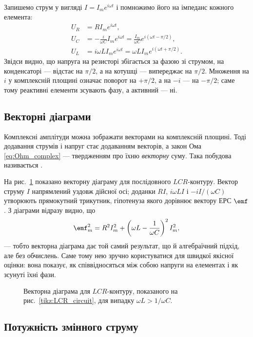 Запишемо струм у вигляді $I = I_m e^{i\omega t}$ і помножимо його на імпеданс кожного елемента:
\begin{align}
	U_R &= R I_m e^{i\omega t}, \label{eq:UR_phase} \\[4pt]
	U_C &= -\frac{i}{\omega C} I_m e^{i\omega t}
	      = \frac{I_m}{\omega C} e^{i(\omega t - \pi/2)}, \label{eq:UC_phase} \\[4pt]
	U_L &= i\omega L I_m e^{i\omega t}
	      = \omega L I_m e^{i(\omega t + \pi/2)}. \label{eq:UL_phase}
\end{align}
Звідси видно, що напруга на резисторі збігається за фазою зі струмом, на конденсаторі --- відстає на $\pi/2$, а на котушці --- випереджає на $\pi/2$. Множення на $i$ у комплексній площині означає поворот на $+\pi/2$, а на $-i$ --- на $-\pi/2$; саме тому реактивні елементи зсувають фазу, а активний --- ні.

\subsection*{Векторні діаграми}

Комплексні амплітуди можна зображати векторами на комплексній площині. Тоді додавання струмів і напруг стає додаванням векторів, а закон Ома \eqref{eq:Ohm_complex} --- твердженням про їхню \emph{векторну} суму. Така побудова називається .

На рис.~\ref{tikz:vector_diagram_full} показано векторну діаграму для послідовного $LCR$-контуру. Вектор струму $I$ напрямлений уздовж дійсної осі; доданки $RI$, $i\omega L I$ і $-iI/(\omega C)$ утворюють прямокутний трикутник, гіпотенуза якого дорівнює вектору ЕРС $\emf$. З діаграми відразу видно, що
\[
	\emf_m^2 = R^2 I_m^2 + \left(\omega L - \frac{1}{\omega C}\right)^2 I_m^2,
\]
--- тобто векторна діаграма дає той самий результат, що й алгебраїчний підхід, але без обчислень. Саме тому нею зручно користуватися для швидкої якісної оцінки: вона показує, як співвідносяться між собою напруги на елементах і як зсунуті їхні фази.

\begin{figure}[h!]
	\centering
	\caption{Векторна діаграма для $LCR$-контуру, показаного на рис.~\ref{tikz:LCR_circuit}, для випадку $\omega L > 1/\omega C$.}
	\label{tikz:vector_diagram_full}
\end{figure}

\subsection*{Потужність змінного струму}

